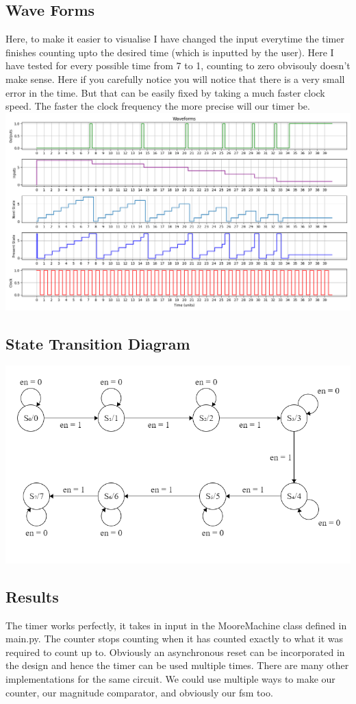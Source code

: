\documentclass[a4paper,10pt]{article}
\begin{document}
\subsection{Wave Forms}
Here, to make it easier to visualise I have changed the input everytime the timer finishes counting upto the desired time (which is inputted by the user). Here I have tested for every possible time from 7 to 1, counting to zero obvisouly doesn't make sense. Here if you carefully notice you will notice that there is a very small error in the time. But that can be easily fixed by taking a much faster clock speed. The faster the clock frequency the more precise will our timer be.\newline
\includegraphics[scale=0.5]{wave_form.png}

\subsection{State Transition Diagram}
\includegraphics[scale=0.75]{state_dia.png}

\subsection{Results}
The timer works perfectly, it takes in input in the MooreMachine class defined in main.py. The counter stops counting when it has counted exactly to what it was required to count up to. Obviously an asynchronous reset can be incorporated in the design and hence the timer can be used multiple times. There are many other implementations for the same circuit. We could use multiple ways to make our counter, our magnitude comparator, and obviously our fsm too.


% 
%  
\end{document}
